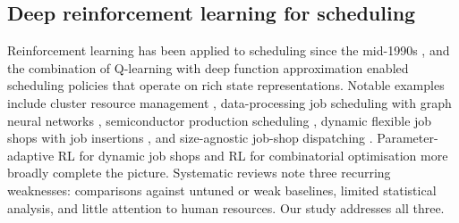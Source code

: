\subsection{Deep reinforcement learning for scheduling}
Reinforcement learning has been applied to scheduling since the mid-1990s \cite{zhang1995,aydin2000}, and the combination of Q-learning \cite{watkins1992} with deep function approximation \cite{mnih2015} enabled scheduling policies that operate on rich state representations. Notable examples include cluster resource management \cite{mao2016}, data-processing job scheduling with graph neural networks \cite{mao2019}, semiconductor production scheduling \cite{waschneck2018}, dynamic flexible job shops with job insertions \cite{luo2020,song2023}, and size-agnostic job-shop dispatching \cite{zhang2020l2d,park2021,liu2020}. Parameter-adaptive RL for dynamic job shops \cite{shahrabi2017} and RL for combinatorial optimisation more broadly \cite{bengio2021,mazyavkina2021} complete the picture.  Systematic reviews \cite{kayhan2023,panzer2022,khadivi2025} note three recurring weaknesses: comparisons against untuned or weak baselines, limited statistical analysis, and little attention to human resources. Our study addresses all three.

